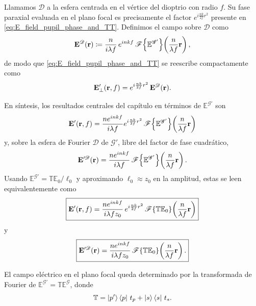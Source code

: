 Llamamos $\mathscr{D}$ a la esfera centrada en el vértice del dioptrio con radio $f$. Su fase paraxial evaluada en el plano focal es precisamente el factor $e^{i\frac{nk}{2f}r^2}$ presente en \eqref{eq:E_field_pupil_phase_and_TT}. Definimos el campo sobre $\mathscr{D}$ como
\begin{equation}
  \vb E^{\mathscr D}(\vb r)
  \coloneqq
  \frac{n}{i\lambda f}\,e^{inkf}
  \,\mathscr F\!\left\{\mathbb E^{\mathscr G'}\right\}
  \!\left(\frac{n}{\lambda f}\vb r\right),
  \label{eq:E_D_def}
\end{equation}
de modo que \eqref{eq:E_field_pupil_phase_and_TT} se reescribe compactamente como
\begin{equation}
  \vb E'_\perp(\vb r, f)
  =
  e^{i\frac{nk}{2f}r^2}\,
  \vb E^{\mathscr D}(\vb r).
  \label{eq:E_field_as_Debye}
\end{equation}

En síntesis, los resultados centrales del capítulo en términos de $\mathbb E^{\mathscr G'}$ son
\begin{equation}
  \vb E'(\vb r, f)
  =
  \frac{ne^{inkf}}{i\lambda f}e^{i\frac{nk}{2f}r^2}
  \,\mathscr F\!\left\{\mathbb E^{\mathscr G'}\right\}\!\left(\frac{n}{\lambda f}\vb r\right)
  \label{eq:E_field_in_EGp}
\end{equation}
y, sobre la esfera de Fourier $\mathscr D$ de $\mathscr G'$, libre del factor de fase cuadrático,
\begin{equation}
  \vb E'^{\mathscr D}(\vb r)
  =
  \frac{n e^{inkf}}{i\lambda f}  \,\mathscr F\!\left\{\mathbb E^{\mathscr G'}\right\}\!\left(\frac{n}{\lambda f}\vb r\right).
  \label{eq:E_D_in_EGp}
\end{equation}
Usando $\mathbb E^{\mathscr G'} = \mathbb T \mathbb E_0 / \ell_0$ y aproximando $\ell_0 \approx z_0$ en la amplitud, estas se leen equivalentemente como
\begin{equation}
\boxed{
  \vb E'(\vb r, f)
  =
  \frac{ne^{inkf}}{i\lambda f z_0}\,e^{i\frac{nk}{2f}r^2}\,\mathscr F\!\left\{\mathbb T\mathbb E_0\right\}\!\left(\frac{n}{\lambda f}\vb r\right)
}
  \label{eq:E_prime_func_of_M_E0}
\end{equation}
y
\begin{equation}
\boxed{
  \vb E'^{\mathscr D}(\vb r)
  =
  \frac{ne^{inkf}}{i\lambda f z_0}  \,\mathscr F\!\left\{\mathbb T\mathbb E_0\right\}\!\left(\frac{n}{\lambda f}\vb r\right).
}
  \label{eq:E_prime_D_function_of_M_E0}
\end{equation}

El campo eléctrico en el plano focal queda determinado por la transformada de Fourier de $\mathbb E^{\mathscr G'} = \mathbb T \mathbb E^{\mathscr G}$, donde
\begin{equation}
  \mathbb T
  =
  \ket{p'} \bra p\, t_p
  +
  \ket{s} \bra s\, t_s.
  \label{eq:def_M_bb}
\end{equation}

